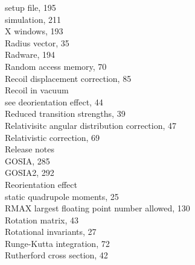 \documentclass[10pt]{article}
\begin{document}
setup file, 195\\
simulation, 211\\
X windows, 193\\
Radius vector, 35\\
Radware, 194\\
Random access memory, 70\\
Recoil displacement correction, 85\\
Recoil in vacuum\\
see deorientation effect, 44\\
Reduced transition strengths, 39\\
Relativisitc angular distribution correction, 47\\
Relativistic correction, 69\\
Release notes\\
GOSIA, 285\\
GOSIA2, 292\\
Reorientation effect\\
static quadrupole moments, 25\\
RMAX largest floating point number allowed, 130\\
Rotation matrix, 43\\
Rotational invariants, 27\\
Runge-Kutta integration, 72\\
Rutherford cross section, 42
\end{document}

